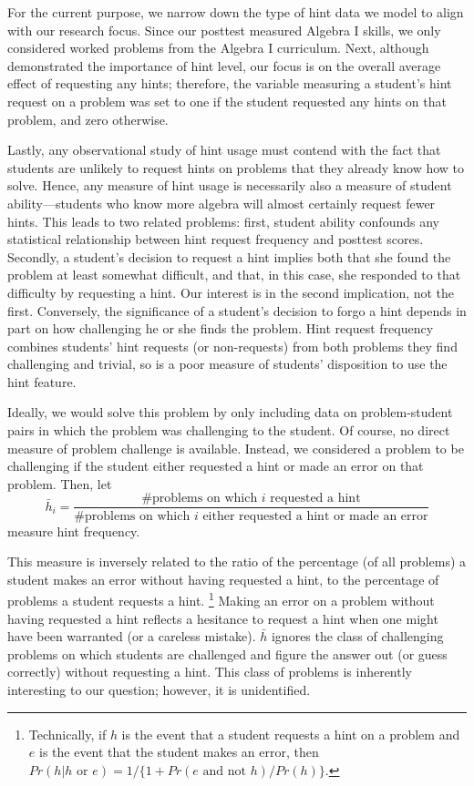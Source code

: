 \documentclass{article}\usepackage[]{graphicx}\usepackage[]{color}
\begin{document}
For the current purpose, we narrow down the type
of hint data we model to align with our research focus.
Since our posttest measured Algebra I skills, we only
considered worked problems from the Algebra I curriculum.
Next, although \citet{goldin2012learner} demonstrated the importance
of hint level, our focus is on the overall average effect of
requesting any hints; therefore, the variable measuring a student's
hint request on a problem was set to one if the student requested any
hints on that problem, and zero otherwise.

Lastly, any observational study of hint usage must contend with the
fact that students are unlikely to request hints on problems that they
already know how to solve.
Hence, any measure of hint usage is necessarily also a measure of
student ability---students who know more algebra will almost certainly
request fewer hints.
This leads to two related problems: first, student ability
confounds any statistical relationship between hint request frequency
and posttest scores.
Secondly,
a student's decision to request a hint implies both that she
found the problem at least somewhat difficult, and that, in this case,
she responded to that difficulty by requesting a hint.
Our interest is in the second implication, not the first.
Conversely, the significance of a student's decision to forgo a hint
depends in part on how challenging he or she finds the problem.
Hint request frequency combines students' hint requests (or non-requests) from both
problems they find challenging and trivial, so is a poor measure of
students' disposition to use the hint feature.

Ideally, we would solve this problem by only including data on
problem-student pairs in which the problem was challenging to the
student.
Of course, no direct measure of problem challenge is available.
Instead, we considered a problem to be challenging if the student
either requested a hint or made an error on that problem.
Then, let
\begin{equation*}
\bar{h}_i=\frac{\text{\# problems on which }i\text{ requested a
    hint}}{\text{\# problems on which }i\text{ either requested a hint
    or made an error}}
\end{equation*}
measure hint frequency.

This measure is inversely related to the ratio of the percentage (of
all
problems) a student makes an error without having requested a hint,
to the percentage of problems a student requests a hint.%
\footnote{Technically, if $h$ is the event that a student requests
a hint on a problem and $e$ is the event that the student makes
an error, then $Pr(h|h\text{ or }e)=1/\{1+Pr(e\text{ and not }h)/Pr(h)\}$.}
Making an error on a problem without having requested a hint reflects
a hesitance to request a hint when one might have been warranted (or a
careless mistake).
$\bar{h}$ ignores the class of challenging problems on which students
are challenged and figure the answer out (or guess correctly) without
requesting a hint.
This class of problems is inherently interesting to our question;
however, it is unidentified.
\end{document}
